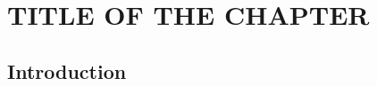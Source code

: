 %



\chapter{TITLE OF THE CHAPTER}
\label{ch:min_substitution_in_ab_string}
\section*{Introduction}

